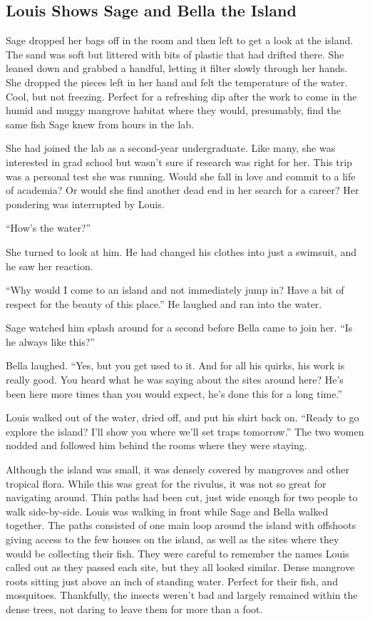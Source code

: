 \documentclass[12pt, fleqn, AofM.tex]{subfiles}
\begin{document}
\subsection{Louis Shows Sage and Bella the Island}
Sage dropped her bags off in the room and then left to get a look at the island. The sand was soft but littered with bits of plastic that had drifted there. She leaned down and grabbed a handful, letting it filter slowly through her hands. She dropped the pieces left in her hand and felt the temperature of the water. Cool, but not freezing. Perfect for a refreshing dip after the work to come in the humid and muggy mangrove habitat where they would, presumably, find the same fish Sage knew from hours in the lab.

She had joined the lab as a second-year undergraduate. Like many, she was interested in grad school but wasn't sure if research was right for her. This trip was a personal test she was running. Would she fall in love and commit to a life of academia? Or would she find another dead end in her search for a career? Her pondering was interrupted by Louis.

“How's the water?”

She turned to look at him. He had changed his clothes into just a swimsuit, and he saw her reaction. 

“Why would I come to an island and not immediately jump in? Have a bit of respect for the beauty of this place.” He laughed and ran into the water.

Sage watched him splash around for a second before Bella came to join her. “Is he always like this?”

Bella laughed. “Yes, but you get used to it. And for all his quirks, his work is really good. You heard what he was saying about the sites around here? He's been here more times than you would expect, he's done this for a long time.”

Louis walked out of the water, dried off, and put his shirt back on. “Ready to go explore the island? I'll show you where we'll set traps tomorrow.” The two women nodded and followed him behind the rooms where they were staying. 

Although the island was small, it was densely covered by mangroves and other tropical flora. While this was great for the rivulus, it was not so great for navigating around. Thin paths had been cut, just wide enough for two people to walk side-by-side. Louis was walking in front while Sage and Bella walked together. The paths consisted of one main loop around the island with offshoots giving access to the few houses on the island, as well as the sites where they would be collecting their fish. They were careful to remember the names Louis called out as they passed each site, but they all looked similar. Dense mangrove roots sitting just above an inch of standing water. Perfect for their fish, and mosquitoes. Thankfully, the insects weren't bad and largely remained within the dense trees, not daring to leave them for more than a foot. 
\end{document}
